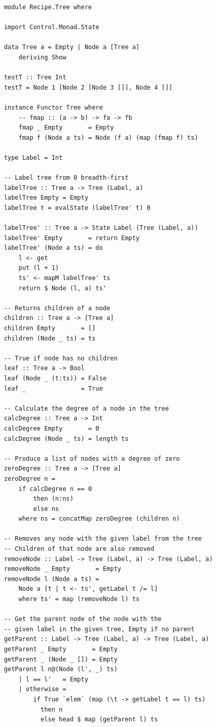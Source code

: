\documentclass[11pt]{article}
\begin{document}
    \begin{tt}
    \small
    \begin{lstlisting}
    module Recipe.Tree where
    
    import Control.Monad.State
    
    data Tree a = Empty | Node a [Tree a]
        deriving Show
    
    testT :: Tree Int
    testT = Node 1 [Node 2 [Node 3 []], Node 4 []]
    
    instance Functor Tree where
        -- fmap :: (a -> b) -> fa -> fb
        fmap _ Empty       = Empty
        fmap f (Node a ts) = Node (f a) (map (fmap f) ts)
    
    type Label = Int
    
    -- Label tree from 0 breadth-first 
    labelTree :: Tree a -> Tree (Label, a)
    labelTree Empty = Empty
    labelTree t = evalState (labelTree' t) 0
    
    labelTree' :: Tree a -> State Label (Tree (Label, a))
    labelTree' Empty       = return Empty
    labelTree' (Node a ts) = do
        l <- get
        put (l + 1)
        ts' <- mapM labelTree' ts
        return $ Node (l, a) ts'
        
    -- Returns children of a node
    children :: Tree a -> [Tree a]
    children Empty       = []
    children (Node _ ts) = ts
    
    -- True if node has no children
    leaf :: Tree a -> Bool
    leaf (Node _ (t:ts)) = False
    leaf _               = True
    
    -- Calculate the degree of a node in the tree
    calcDegree :: Tree a -> Int
    calcDegree Empty       = 0
    calcDegree (Node _ ts) = length ts
    
    -- Produce a list of nodes with a degree of zero
    zeroDegree :: Tree a -> [Tree a]
    zeroDegree n =
        if calcDegree n == 0
            then (n:ns)
            else ns
        where ns = concatMap zeroDegree (children n)
        
    -- Removes any node with the given label from the tree
    -- Children of that node are also removed
    removeNode :: Label -> Tree (Label, a) -> Tree (Label, a)
    removeNode _ Empty       = Empty
    removeNode l (Node a ts) =
        Node a [t | t <- ts', getLabel t /= l]
        where ts' = map (removeNode l) ts
    
    -- Get the parent node of the node with the
    -- given label in the given tree, Empty if no parent
    getParent :: Label -> Tree (Label, a) -> Tree (Label, a)
    getParent _ Empty       = Empty
    getParent _ (Node _ []) = Empty
    getParent l n@(Node (l', _) ts)
        | l == l'   = Empty
        | otherwise =
            if True `elem` (map (\t -> getLabel t == l) ts)
              then n
              else head $ map (getParent l) ts
    

\end{lstlisting}
\end{tt}
\end{document}
